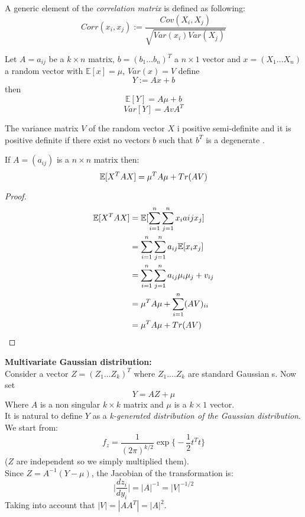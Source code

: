 \begin{defi}
	A generic element of the \textit{correlation matrix} is defined as following:
	\[
	Corr(x_i,x_j) := \frac{Cov(X_i,X_j)}{\sqrt{Var(x_i)Var(X_j)}}	
	\]
\end{defi}

\begin{lem}
Let $A=a_{ij}$ be a $k \times n$ matrix, $b=(b_1 \dots b_n)^T$ a $n\times 1$ vector and  $x=(X_1\dots X_n)$ a random vector with $\mathbb{E}[x]=\mu$, $Var(x)=V$ define 
$$Y:=Ax+b$$
then
$$\mathbb{E}[Y]=A\mu+b$$
$$Var[Y]=AvA^T$$
\end{lem}

\begin{lem}
	The variance matrix $V$ of the random vector $X$ i positive semi-definite and it is positive definite if there exist no vectors $b$ such that $b^T$ is a degenerate \rv .
\end{lem}

\begin{lem}
If $A=(a_{ij})$ is a $n \times n$ matrix then:
$$\mathbb{E} [X^TAX]=\mu^T A \mu + Tr(AV)$$
\end{lem}
\begin{proof}
		\[
	\begin{split}
	\mathbb{E}  [X^TAX]
	&=\mathbb{E}[\sum_{i=1}^{n}\sum_{j=1}^{n}x_i a{ij}x_j]\\
	&=\sum_{i=1}^{n}\sum_{j=1}^{n} a_{ij}\mathbb{E}[x_i x_j]\\
	&=\sum_{i=1}^{n}\sum_{j=1}^{n}a_{ij}\mu_i\mu_j + v_{ij}\\
	&= \mu^T A \mu + \sum_{i=1}^{n}(AV)_{ii}\\
	&=\mu^T A \mu + Tr(AV)
	\end{split}
	\]
\end{proof}

\textbf{Multivariate Gaussian distribution:}\\

Consider a vector $Z=(Z_1...Z_k)^T$ where $Z_1....Z_k$ are \iid standard Gaussian \rv s. Now set 
$$Y=AZ+\mu$$
Where $A$ is a non singular  $k \times k$ matrix and $\mu$ is a $k \times 1$ vector.\\
It is natural to define $Y$ as a \textit{k-generated distribution of the Gaussian distribution}.\\
We start from:
$$f_z=\frac{1}{(2\pi)^{k/2}}\exp \bigg\{ -\frac{1}{2}t^Tt \bigg\}$$
($Z$ are independent so we simply multiplied them).\\
Since $Z=A^{-1}(Y-\mu)$, the Jacobian of the transformation is:
$$\bigg| \frac{dz_i}{dy_i} \bigg|=|A|^{-1}=|V|^{-1/2}$$
Taking into account that $|V|=|AA^T|=|A|^2$.

